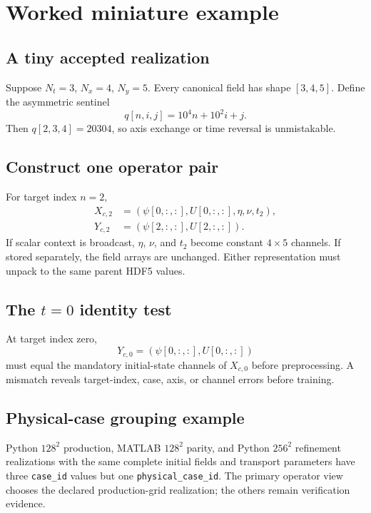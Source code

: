 \documentclass[11pt]{article}
\newcommand{\code}[1]{\texttt{#1}}
\begin{document}
\section{Worked miniature example}
\label{sec:worked}

\subsection{A tiny accepted realization}
Suppose $N_t=3$, $N_x=4$, $N_y=5$. Every canonical field has shape $[3,4,5]$. Define the asymmetric sentinel
\begin{equation}
q[n,i,j]=10^4n+10^2i+j.
\end{equation}
Then $q[2,3,4]=20304$, so axis exchange or time reversal is unmistakable.

\subsection{Construct one operator pair}
For target index $n=2$,
\begin{align}
X_{c,2}&=(\psi[0,:,:],U[0,:,:],\eta,\nu,t_2),\\
Y_{c,2}&=(\psi[2,:,:],U[2,:,:]).
\end{align}
If scalar context is broadcast, $\eta$, $\nu$, and $t_2$ become constant $4\times5$ channels. If stored separately, the field arrays are unchanged. Either representation must unpack to the same parent HDF5 values.

\subsection{The $t=0$ identity test}
At target index zero,
\begin{equation}
Y_{c,0}=(\psi[0,:,:],U[0,:,:])
\end{equation}
must equal the mandatory initial-state channels of $X_{c,0}$ before preprocessing. A mismatch reveals target-index, case, axis, or channel errors before training.

\subsection{Physical-case grouping example}
Python $128^2$ production, MATLAB $128^2$ parity, and Python $256^2$ refinement realizations with the same complete initial fields and transport parameters have three \code{case\_id} values but one \code{physical\_case\_id}. The primary operator view chooses the declared production-grid realization; the others remain verification evidence.
\end{document}
